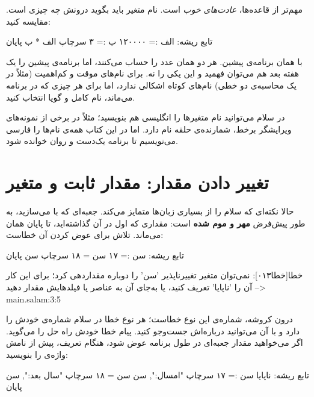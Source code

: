 مهم‌تر از قاعده‌ها، \emph{عادت‌های خوب} است. نام متغیر باید بگوید درونش چه
چیزی است. مقایسه کنید:

\begin{salamfa}
تابع ریشه:
    الف := ۱۲۰۰۰۰
    ب := ۳
    سرچاپ الف * ب
پایان
\end{salamfa}

با همان برنامه‌ی پیشین. هر دو همان عدد را حساب می‌کنند، اما برنامه‌ی پیشین را یک هفته بعد هم
می‌توان فهمید و این یکی را نه. برای نام‌های موقت و کم‌اهمیت (مثلاً در یک
محاسبه‌ی دو خطی) نام‌های کوتاه اشکالی ندارد، اما برای هر چیزی که در برنامه
می‌ماند، نام کامل و گویا انتخاب کنید.

\begin{tip}
در سلام می‌توانید نام متغیرها را انگلیسی هم بنویسید؛ مثلاً در برخی از
نمونه‌های ویرایشگر برخط، شمارنده‌ی حلقه  نام دارد. اما در این
کتاب همه‌ی نام‌ها را فارسی می‌نویسیم تا برنامه یک‌دست و روان خوانده شود.
\end{tip}

\section{تغییر دادن مقدار: مقدار ثابت و متغیر}

حالا نکته‌ای که سلام را از بسیاری زبان‌ها متمایز می‌کند. جعبه‌ای که با
\code{:=} می‌سازید، به طور پیش‌فرض \textbf{مهر و موم شده} است: مقداری که
اول در آن گذاشته‌اید، تا پایان همان می‌ماند. تلاش برای عوض کردن آن خطاست:

\begin{salamfa}
تابع ریشه:
    سن := ۱۷
    سن = ۱۸
    سرچاپ سن
پایان
\end{salamfa}

\begin{outputfa}
خطا[خطا۰۱۳]: نمی‌توان متغیر تغییرناپذیر 'سن' را دوباره مقداردهی کرد؛
برای این کار آن را 'ناپایا' تعریف کنید،
یا به‌جای آن به عناصر یا فیلدهایش مقدار دهید
 --> main.salam:3:5
\end{outputfa}

 درون کروشه، شماره‌ی این نوع خطاست؛ هر نوع خطا در سلام شماره‌ی
خودش را دارد و با آن می‌توانید درباره‌اش جست‌وجو کنید. پیام خطا خودش راه حل را می‌گوید. اگر می‌خواهید مقدار جعبه‌ای در طول
برنامه عوض شود، هنگام تعریف، پیش از نامش واژه‌ی  را بنویسید:

\begin{salamfa}
تابع ریشه:
    ناپایا سن := ۱۷
    سرچاپ "امسال:", سن
    سن = ۱۸
    سرچاپ "سال بعد:", سن
پایان
\end{salamfa}

